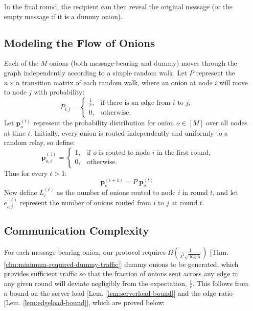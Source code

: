 In the final round, the recipient can then reveal the original message (or the empty message if it is a dummy onion).


\subsection{Modeling the Flow of Onions}

Each of the $M$ onions (both message-bearing and dummy) moves through the graph independently according to a simple random walk. Let $P$ represent the $n \times n$ transition matrix of each random walk, where an onion at node $i$ will move to node $j$ with probability:
$$
P_{i,j} = 
\begin{cases}
    \frac{1}{r}, & \text{if there is an edge from $i$ to $j$},\\
    0, & \text{otherwise.}
\end{cases}
$$
Let $\mathbf{p}^{(t)}_{o}$ represent the probability distribution for onion $o \in [M]$ over all nodes at time $t$. Initially, every onion is routed independently and uniformly to a random relay, so define: 
$$
\mathbf{p}^{(1)}_{o,i} = 
\begin{cases}
    1, & \text{if $o$ is routed to node $i$ in the first round,}\\
    0, & \text{otherwise.}
\end{cases}
$$
Thus for every $t > 1$:
$$
\mathbf{p}^{(t+1)}_{o} = P \; \mathbf{p}^{(t)}_{o}
$$
Now define $L^{(t)}_i$ as the number of onions routed to node $i$ in round $t$, and let $e^{(t)}_{i,j}$ represent the number of onions routed from $i$ to $j$ at round $t$.

\subsection{Communication Complexity}

For each message-bearing onion, our protocol requires $\Omega\left(\frac{1}{\lambda^2 \sqrt{\log \lambda}}\right)$ [Thm. \ref{clm:minimum-required-dummy-traffic}] dummy onions to be generated, which provides sufficient traffic so that the fraction of onions sent across any edge in any given round will deviate negligibly from the expectation, $\frac{1}{r}$. This follows from a bound on the server load [Lem. \ref{lem:serverload-bound}] and the edge ratio [Lem. \ref{lem:edgeload-bound}], which are proved below:

